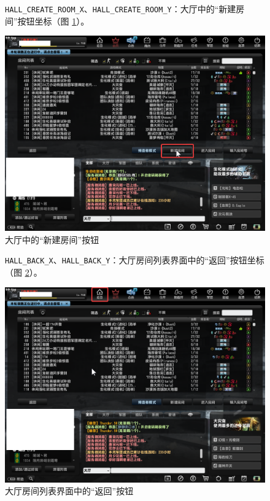 \begin{figure}[H]
    \Centering
    \parbox[l]{\textwidth}{\lstinline{HALL_CREATE_ROOM_X}、\lstinline{HALL_CREATE_ROOM_Y}：大厅中的“新建房间”按钮坐标（图 \ref{ch2fig-create-room-0}）。}
    \includegraphics[width=\textwidth]{docs/assets/create_room_0}
    \caption{大厅中的“新建房间”按钮}
    \label{ch2fig-create-room-0}
\end{figure}


\begin{figure}[H]
    \Centering
    \parbox[l]{\textwidth}{\lstinline{HALL_BACK_X}、\lstinline{HALL_BACK_Y}：大厅房间列表界面中的“返回”按钮坐标（图 \ref{ch2fig-hall-back}）。}
    \includegraphics[width=\textwidth]{docs/assets/hall_back}
    \caption{大厅房间列表界面中的“返回”按钮}
    \label{ch2fig-hall-back}
\end{figure}


